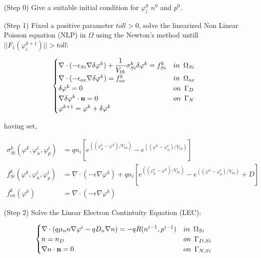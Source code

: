 \begin{itemize}


\item[(Step 0)] Give a suitable initial condition for $\varphi^0_i$ $n^0$ and $p^0$.

\item[(Step 1)] Fixed a positive parameter $toll>0$, solve the linearized Non Linear Poisson equation (NLP) in $\Omega$ using the Newton's method untill $||F_1(\varphi^{k+1}_i)||>toll$:


\begin{equation}
\label{eq: newton step NLP linear}
\begin{cases}

\nabla \cdot (-\epsilon_{Si} \nabla \delta\varphi^k) 
+   \dfrac{1}{V_{th}} \sigma_{Si}^k\delta\varphi^k 
 =  f_{Si}^k & in \psp{3} \Omega_{Si}
  \\
\nabla \cdot (-\epsilon_{ox} \nabla \delta\varphi^k) =  f_{ox}^k & in \psp{3} \Omega_{ox} 
\\
\delta \varphi^k = 0 & on \psp{3} \Gamma_D 
\\
\nabla \delta \varphi^k \cdot \vect{n} = 0 & on \psp{3} \Gamma_N
\\
\varphi^{k+1}=\varphi^k+\delta \varphi^k
\end{cases} 
\end{equation}

having set,

\begin{align*}
\sigma_{Si}^k(\varphi^{k},\varphi_n^{i},\varphi_p^{i}) & = qn_i \left[ e^{((\varphi_p^i-\varphi^k)/V_{th})}-e^{((\varphi^k-\varphi_n^i)/V_{th})} \right]
\\
f_{Si}^k(\varphi^k,\varphi_n^i,\varphi_p^i) & = \nabla \cdot (-\epsilon \nabla \varphi^k) + qn_i \left[ e^{((\varphi_p^i-\varphi^k)/V_{th})}-e^{((\varphi^k-\varphi_n^i)/V_{th})}  + D \right]
\\
f_{ox}^k(\varphi^k) & = \nabla \cdot (-\epsilon \nabla \varphi^k) 
\end{align*}



\item[(Step 2)] Solve the Linear Electron Contintuity Equation (LEC):

\begin{equation}
\label{eq: LEC system}
\begin{cases}
 \nabla \cdot ( q\mu_n n \nabla \varphi^i - qD_n \nabla n ) = -qR(n^{i-1},p^{i-1}) & in \psp{3} \Omega_{Si}
 \\
 n = n_D & on \psp{3} \Gamma_{D,Si}
 \\
 \nabla n \cdot \vect{n} = 0 & on \psp{3} \Gamma_{N,Si}
\end{cases}
\end{equation}


\end{itemize}
